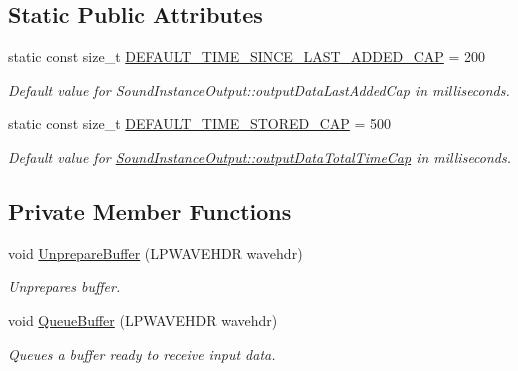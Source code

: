 \subsection*{Static Public Attributes}
\begin{DoxyCompactItemize}
\item 
\hypertarget{class_sound_instance_output_ae12e8c17801490274100001a1e94f636}{
static const size\_\-t \hyperlink{class_sound_instance_output_ae12e8c17801490274100001a1e94f636}{DEFAULT\_\-TIME\_\-SINCE\_\-LAST\_\-ADDED\_\-CAP} = 200}
\label{class_sound_instance_output_ae12e8c17801490274100001a1e94f636}

\begin{DoxyCompactList}\small\item\em Default value for SoundInstanceOutput::outputDataLastAddedCap in milliseconds. \item\end{DoxyCompactList}\item 
\hypertarget{class_sound_instance_output_a701428cfaa968358f75f9be38b86753c}{
static const size\_\-t \hyperlink{class_sound_instance_output_a701428cfaa968358f75f9be38b86753c}{DEFAULT\_\-TIME\_\-STORED\_\-CAP} = 500}
\label{class_sound_instance_output_a701428cfaa968358f75f9be38b86753c}

\begin{DoxyCompactList}\small\item\em Default value for \hyperlink{class_sound_instance_output_a3b7132b8d865398f9b37ed6a715b3855}{SoundInstanceOutput::outputDataTotalTimeCap} in milliseconds. \item\end{DoxyCompactList}\end{DoxyCompactItemize}
\subsection*{Private Member Functions}
\begin{DoxyCompactItemize}
\item 
void \hyperlink{class_sound_instance_output_a0c44802de559d280a15ad66fc0fa4df6}{UnprepareBuffer} (LPWAVEHDR wavehdr)
\begin{DoxyCompactList}\small\item\em Unprepares buffer. \item\end{DoxyCompactList}\item 
void \hyperlink{class_sound_instance_output_a5fb6653bf1a496ef1029d5db55bf197f}{QueueBuffer} (LPWAVEHDR wavehdr)
\begin{DoxyCompactList}\small\item\em Queues a buffer ready to receive input data. \item\end{DoxyCompactList}\end{DoxyCompactItemize}
